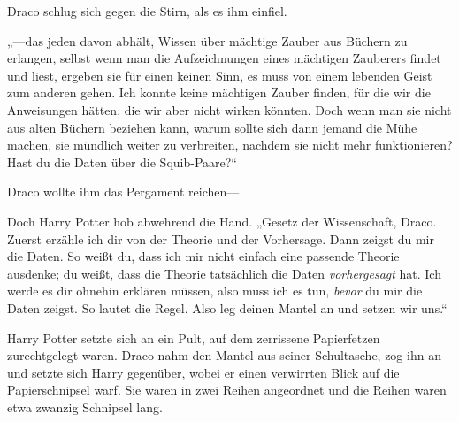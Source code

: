 Draco schlug sich gegen die Stirn, als es ihm einfiel.

„—das jeden davon abhält, Wissen über mächtige Zauber aus Büchern zu erlangen, selbst wenn man die Aufzeichnungen eines mächtigen Zauberers findet und liest, ergeben sie für einen keinen Sinn, es muss von einem lebenden Geist zum anderen gehen. Ich konnte keine mächtigen Zauber finden, für die wir die Anweisungen hätten, die wir aber nicht wirken könnten. Doch wenn man sie nicht aus alten Büchern beziehen kann, warum sollte sich dann jemand die Mühe machen, sie mündlich weiter zu verbreiten, nachdem sie nicht mehr funktionieren? Hast du die Daten über die Squib-Paare?“

Draco wollte ihm das Pergament reichen—

Doch Harry Potter hob abwehrend die Hand.
„Gesetz der Wissenschaft, Draco. Zuerst erzähle ich dir von der Theorie und der Vorhersage. Dann zeigst du mir die Daten. So weißt du, dass ich mir nicht einfach eine passende Theorie ausdenke; du weißt, dass die Theorie tatsächlich die Daten \emph{vorhergesagt} hat. Ich werde es dir ohnehin erklären müssen, also muss ich es tun, \emph{bevor} du mir die Daten zeigst. So lautet die Regel. Also leg deinen Mantel an und setzen wir uns.“

Harry Potter setzte sich an ein Pult, auf dem zerrissene Papierfetzen zurechtgelegt waren. Draco nahm den Mantel aus seiner Schultasche, zog ihn an und setzte sich Harry gegenüber, wobei er einen verwirrten Blick auf die Papierschnipsel warf. Sie waren in zwei Reihen angeordnet und die Reihen waren etwa zwanzig Schnipsel lang.

